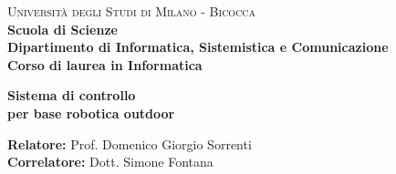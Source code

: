 
    
    \begin{titlepage}
        
        \noindent
        \begin{minipage}[t]{0.19\textwidth}
        \end{minipage}
        \begin{minipage}[t]{0.81\textwidth}
        {
                {\textsc{Università degli Studi di Milano - Bicocca}} \\
                \textbf{Scuola di Scienze} \\
                \textbf{Dipartimento di Informatica, Sistemistica e Comunicazione} \\
                \textbf{Corso di laurea in Informatica} \\
                \par
        }
        \end{minipage}
        
	\vspace{40mm}
        
	\begin{center}
            {\LARGE{
                    \textbf{Sistema di controllo  \\ per base robotica outdoor}
                    \par
            }}
        \end{center}
        
        \vspace{50mm}

        \noindent
        {\large \textbf{Relatore:} Prof. Domenico Giorgio Sorrenti } \\

        \noindent
        {\large \textbf{Correlatore:} Dott. Simone Fontana}
        
        \vspace{15mm}


\end{titlepage}
